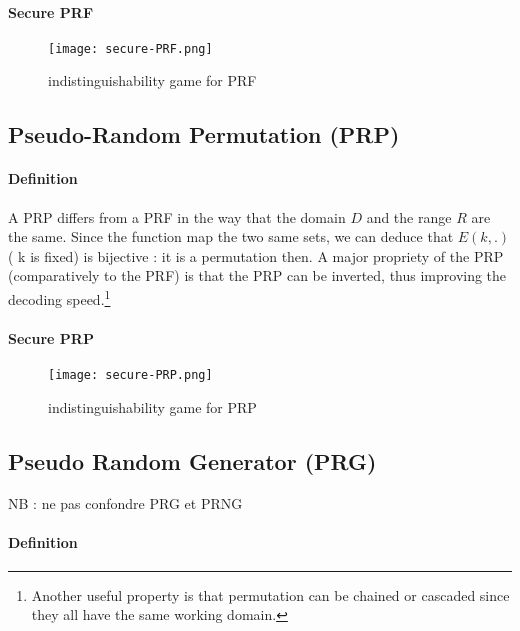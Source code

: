 \paragraph{Secure PRF \\}

\begin{figure}[ht!]
	\centering
		\texttt{[image: secure-PRF.png]}
	\caption{indistinguishability game for PRF}
	\label{fig:Cipher}
\end{figure}


\subsection{Pseudo-Random Permutation   (PRP)}


\paragraph{Definition \\}

A PRP differs from a PRF in the way that the domain $D$ and the range $R$ are the same. Since the function map the two same sets, we can deduce that $E(k,.)$ ( k is fixed) is bijective : it is a permutation then.
A major propriety of the PRP (comparatively to the PRF) is that the PRP can be inverted, thus improving the decoding speed.\footnote{Another useful property is that permutation can be chained or cascaded since they all have the same working domain.}

\paragraph{Secure PRP \\}


\begin{figure}[ht!]
	\centering
		\texttt{[image: secure-PRP.png]}
	\caption{indistinguishability game for PRP}
	\label{fig:Cipher}
\end{figure}

\subsection{Pseudo Random Generator     (PRG)} 

NB : ne pas confondre PRG et PRNG

\paragraph{Definition \\}

